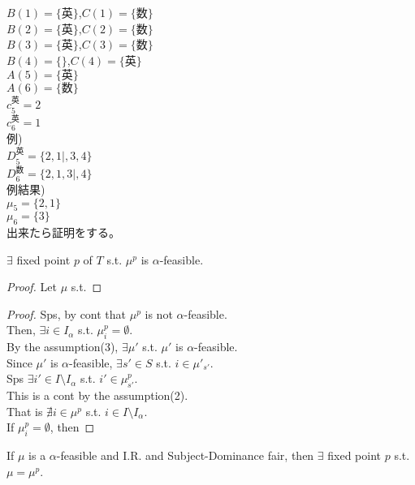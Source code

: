 \documentclass[a4j,10pt]{jsarticle}
\theoremstyle{definition}
\theoremstyle{remark}
\theoremstyle{plain}
\begin{document}
\begin{tcolorbox}[enhanced,breakable=true]
$B(1) = \{\text{英}\}$,$C(1) = \{\text{数}\}$\\
$B(2) = \{\text{英}\}$,$C(2) = \{\text{数}\}$\\
$B(3) = \{\text{英}\}$,$C(3) = \{\text{数}\}$\\
$B(4) = \{\}$,$C(4) = \{\text{英}\}$\\


$A(5) = \{\text{英}\}$\\
$A(6) = \{\text{数}\}$\\

$c_5^{\text{英}} = 2$\\
$c_6^{\text{英}} = 1$\\

例)\\
$D_5^{\text{英}} = \{2,1|,3,4\}$\\
$D_6^{\text{数}} = \{2,1,3|,4\}$\\

例結果)\\
$\mu_5 = \{2,1\}$\\
$\mu_6 = \{3\}$\\


出来たら証明をする。


$\exists$ fixed point $p$ of $T$ s.t. $\mu^p$ is $\alpha$-feasible.\\


\begin{proof}
  Let $\mu$ s.t. 

\end{proof}

\begin{proof}
  Sps, by cont that $\mu^p$ is not $\alpha$-feasible.\\
  Then, $\exists i \in I_\alpha$ s.t. $\mu^p_{i} = \emptyset$.\\
  By the assumption(3), $\exists \mu'$ s.t. $\mu'$ is $\alpha$-feasible.\\
  Since $\mu'$ is $\alpha$-feasible, $\exists s' \in S$ s.t. $i \in \mu'_{s'}$.\\
  Sps $\exists i' \in I \setminus I_\alpha$ s.t. $i' \in \mu^p_{s'}$.\\
  This is a cont by the assumption(2).\\
  That is $\nexists i \in \mu^p$ s.t. $i \in I \setminus I_\alpha$.\\
  If $\mu^p_{i} = \emptyset$, then 
\end{proof}



If $\mu$ is a $\alpha$-feasible and I.R. and Subject-Dominance fair, then $\exists$ fixed point $p$ s.t. $\mu = \mu^p$.\\


\end{tcolorbox}
\end{document}
